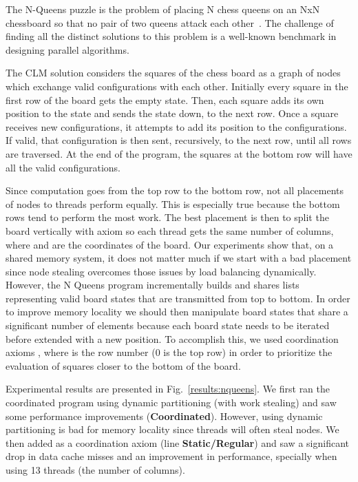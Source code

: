 The N-Queens puzzle is the problem of placing N chess queens on an NxN
chessboard so that no pair of two queens attack each
other~\cite{8queens}. The challenge of finding all the
distinct solutions to this problem is a well-known benchmark in designing
parallel algorithms.

The CLM solution considers the squares of the chess board as a graph
of nodes which exchange valid configurations with each
other. Initially every square in the first row of the board gets the
empty state.  Then, each square adds its own position to the state and
sends the state down, to the next row. Once a square receives new
configurations, it attempts to add its position to the
configurations. If valid, that configuration is then sent,
recursively, to the next row, until all rows are traversed. At the end
of the program, the squares at the bottom row will have all the valid
configurations.

Since computation goes from the top row to the bottom row, not all placements of
nodes to threads perform equally. This is especially true because the bottom
rows tend to perform the most work. The best placement is then to split the
board vertically with axiom  so each thread
gets the same number of columns, where  and  are the coordinates
of the board. Our experiments show that, on a shared memory system, it does not
matter much if we start with a bad placement since node stealing overcomes those
issues by load balancing dynamically.  However, the N Queens program
incrementally builds and shares lists representing valid board states that are
transmitted from top to bottom.  In order to improve memory locality we should
then manipulate board states that share a significant number of elements because
each board state needs to be iterated before extended with a new position.  To
accomplish this, we used coordination axioms ,
where  is the row number (0 is the top row) in order to
prioritize the evaluation of squares closer to the bottom of the
board.

Experimental results are presented in Fig.~\ref{results:nqueens}.  We
first ran the coordinated program using dynamic partitioning (with
work stealing) and saw some performance improvements
(\textbf{Coordinated}). However, using dynamic partitioning is bad for
memory locality since threads will often steal nodes.  We then
added  as a coordination axiom (line
\textbf{Static/Regular}) and saw a significant drop in data cache misses and an
improvement in performance, specially when using 13 threads (the number of
columns).

